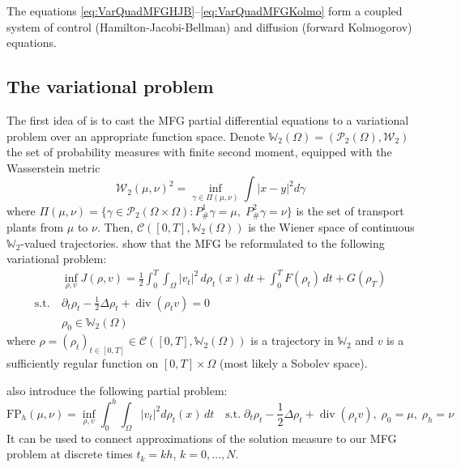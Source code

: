 \documentclass{article}
\newcommand{\WW}{\mathbb{W}}
\newcommand{\calC}{\mathcal{C}}
\newcommand{\calP}{\mathcal{P}}
\newcommand{\calW}{\mathcal{W}}
\newcommand{\suchthat}{\mathrm{s.t.}}
\DeclareMathOperator{\divg}{div}
\begin{document}
The equations \eqref{eq:VarQuadMFGHJB}--\eqref{eq:VarQuadMFGKolmo} form a coupled system of control (Hamilton-Jacobi-Bellman) and diffusion (forward Kolmogorov) equations.

\subsection{The variational problem}

The first idea of \cite{benamou:hal-01295299} is to cast the MFG partial differential equations to a variational problem over an appropriate function space. Denote $\WW_2(\Omega) = (\calP_2(\Omega), \calW_2)$ the set of probability measures with finite second moment, equipped with the Wasserstein metric
\begin{equation}\label{eq:Wasserstein2Metric}
   	\calW_2(\mu,\nu)^2 = \inf_{\gamma\in\Pi(\mu,\nu)}
   	\int {|x-y|}^2 d\gamma
\end{equation}
where $\Pi(\mu,\nu) =\{ \gamma \in \calP_2(\Omega\times\Omega) : P^1_{\#}\gamma = \mu,\; P^2_{\#}\gamma = \nu \}$ is the set of transport plants from $\mu$ to $\nu$.
Then, $\mathcal{C}([0, T], \WW_2(\Omega))$ is the Wiener space of continuous $\WW_2$-valued trajectories.
\textcite{benamou:hal-01295299} show that the MFG be reformulated to the following variational problem:
\begin{subequations}\label{eq:EulerianProblem}
\begin{align}
   	&\inf_{\rho,v} J(\rho, v) =
   	\frac{1}{2}\int_0^T\int_\Omega |v_t|^2 \,d\rho_t(x)\,dt + \int_0^T F(\rho_t)\,dt + G(\rho_T)
   	\\
   	\suchthat\ &\partial_t \rho_t - \frac12\Delta \rho_t + \divg(\rho_t v) = 0 \\
   	&\rho_0 \in \WW_2(\Omega)	
\end{align}
\end{subequations}
where $\rho = (\rho_t)_{t\in[0,T]}\in \calC([0,T], \WW_2(\Omega))$ is a trajectory in $\WW_2$ and $v$ is a sufficiently regular function on $[0,T] \times \Omega$ (most likely a Sobolev space).

\textcite{benamou2018entropy} also introduce the following partial problem:
\begin{equation}\label{eq:FPhPartial}
	\mathrm{FP}_h(\mu,\nu) =
	\inf_{\rho, v} \int_0^h\int_\Omega |v_t|^2 d\rho_t(x)\,dt
	\quad \suchthat\;
	\partial_t\rho_t -\frac12\Delta\rho_t + \divg(\rho_tv),\;
	\rho_0 = \mu,\; \rho_h = \nu
\end{equation}
It can be used to connect approximations of the solution measure to our MFG problem at discrete times $t_k = kh$, $k=0,\ldots,N$.
\end{document}
